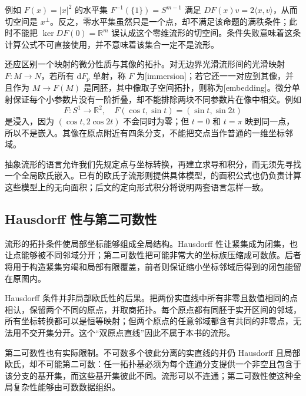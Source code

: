 例如 \(F(x)=|x|^2\) 的水平集 \(F^{-1}(\{1\})=S^{m-1}\) 满足 \(DF(x)v=2\langle x,v\rangle\)，从而切空间是 \(x^\perp\)。反之，零水平集虽然只是一个点，却不满足该命题的满秩条件；此时不能把 \(\ker DF(0)=\mathbb R^m\) 误认成这个零维流形的切空间。条件失败意味着这条计算公式不可直接使用，并不意味着该集合一定不是流形。

\ProseParagraphBreak

还应区别一个映射的微分性质与其像的拓扑。对无边界光滑流形间的光滑映射 \(F:M\rightarrow N\)，若所有 \(\mathrm{d}F_p\) 单射，称 \(F\) 为[immersion]；若它还一一对应到其像，并且作为 \(M\rightarrow F(M)\) 是同胚，其中像取子空间拓扑，则称为[embedding]。微分单射保证每个小参数片没有一阶折叠，却不能排除两块不同参数片在像中相交。例如
\[
 F:S^1\longrightarrow\mathbb R^2,
 \quad F(\cos t,\sin t)=(\sin t,\sin 2t)
\]
是浸入，因为 \((\cos t,2\cos2t)\) 不会同时为零；但 \(t=0\) 和 \(t=\pi\) 映到同一点，所以不是嵌入。其像在原点附近有四条分支，不能把交点当作普通的一维坐标邻域。

\ProseParagraphBreak

抽象流形的语言允许我们先规定点与坐标转换，再建立求导和积分，而无须先寻找一个全局欧氏嵌入。已有的欧氏子流形则提供具体模型，的面积公式也仍负责计算这些模型上的无向面积；后文的定向形式积分将说明两套语言怎样一致。

\subsection{Hausdorff 性与第二可数性}
\label{b1:subsec:E10104}

流形的拓扑条件使局部坐标能够组成全局结构。Hausdorff 性让紧集成为闭集，也让点能够被不同邻域分开；第二可数性把可能非常大的坐标族压缩成可数族。后者将用于构造紧集穷竭和局部有限覆盖，前者则保证缩小坐标邻域后得到的闭包能留在原图内。

\ProseParagraphBreak

Hausdorff 条件并非局部欧氏性的后果。把两份实直线中所有非零且数值相同的点相认，保留两个不同的原点，并取商拓扑。每个原点都有同胚于实开区间的邻域，所有坐标转换都可以是恒等映射；但两个原点的任意邻域都含有共同的非零点，无法用不交开集分开。这个“双原点直线”因此不属于本书的流形。

\ProseParagraphBreak

第二可数性也有实际限制。不可数多个彼此分离的实直线的并仍 Hausdorff 且局部欧氏，却不可能第二可数：任一拓扑基必须为每个连通分支提供一个非空且包含于该分支的基开集，而这些基开集彼此不同。流形可以不连通；第二可数性使这种全局复杂性能够由可数数据组织。

